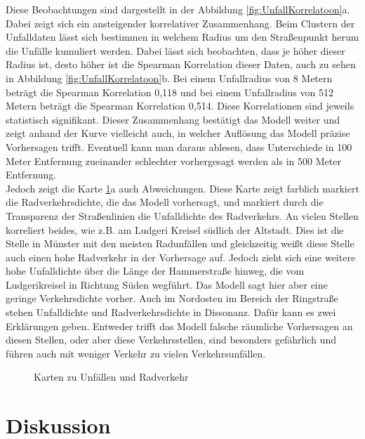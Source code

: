 \documentclass[a4paper,12pt]{thesis}
\begin{document}
Diese Beobachtungen sind dargestellt in der Abbildung \ref{fig:UnfallKorrelatoon}a. Dabei zeigt sich ein ansteigender korrelativer Zusammenhang. Beim Clustern der Unfalldaten lässt sich bestimmen in welchem Radius um den Straßenpunkt herum die Unfälle kumuliert werden. Dabei lässt sich beobachten, dass je höher dieser Radius ist, desto höher ist die Spearman Korrelation dieser Daten, auch zu sehen in Abbildung \ref{fig:UnfallKorrelatoon}b. Bei einem Unfallradius von 8 Metern beträgt die Spearman Korrelation 0,118 und bei einem Unfallradius von 512 Metern beträgt die Spearman Korrelation 0,514. Diese Korrelationen sind jeweils statistisch signifikant. Dieser Zusammenhang bestätigt das Modell weiter und zeigt anhand der Kurve vielleicht auch, in welcher Auflösung das Modell präzise Vorhersagen trifft. Eventuell kann man daraus ablesen, dass Unterschiede in 100 Meter Entfernung zueinander schlechter vorhergesagt werden als in 500 Meter Entfernung.\\
Jedoch zeigt die Karte \ref{fig:Unfallkarten}a auch Abweichungen. Diese Karte zeigt farblich markiert die Radverkehrsdichte, die das Modell vorhersagt, und markiert durch die Transparenz der Straßenlinien die Unfalldichte des Radverkehrs. An vielen Stellen korreliert beides, wie z.B. am Ludgeri Kreisel südlich der Altstadt. Dies ist die Stelle in Münster mit den meisten Radunfällen und gleichzeitig weißt diese Stelle auch einen hohe Radverkehr in der Vorhersage auf. Jedoch zieht sich eine weitere hohe Unfalldichte über die Länge der Hammerstraße hinweg, die vom Ludgerikreisel in Richtung Süden wegführt. Das Modell sagt hier aber eine geringe Verkehrsdichte vorher. Auch im Nordosten im Bereich der Ringstraße stehen Unfalldichte und Radverkehrsdichte in Dissonanz. Dafür kann es zwei Erklärungen geben. Entweder trifft das Modell falsche räumliche Vorhersagen an diesen Stellen, oder aber diese Verkehrsstellen, sind besonders gefährlich und führen auch mit weniger Verkehr zu vielen Verkehrsunfällen.

\begin{figure}%
	\centering
	
	\caption{Karten zu Unfällen und Radverkehr}%
	\label{fig:Unfallkarten}%
\end{figure}

\chapter{Diskussion}
\end{document}
